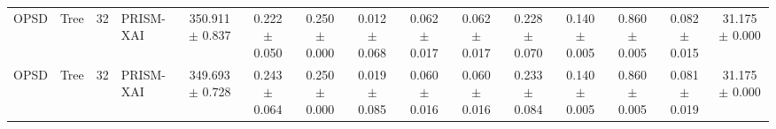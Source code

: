 \begin{table}[t]
\begin{tabular}{llllccccccccccc}
OPSD & Tree & 32 & PRISM-XAI & 350.911 $\pm$ 0.837 & 0.222 $\pm$ 0.050 & 0.250 $\pm$ 0.000 & 0.012 $\pm$ 0.068 & 0.062 $\pm$ 0.017 & 0.062 $\pm$ 0.017 & 0.228 $\pm$ 0.070 & 0.140 $\pm$ 0.005 & 0.860 $\pm$ 0.005 & 0.082 $\pm$ 0.015 & 31.175 $\pm$ 0.000 \\
OPSD & Tree & 32 & PRISM-XAI & 349.693 $\pm$ 0.728 & 0.243 $\pm$ 0.064 & 0.250 $\pm$ 0.000 & 0.019 $\pm$ 0.085 & 0.060 $\pm$ 0.016 & 0.060 $\pm$ 0.016 & 0.233 $\pm$ 0.084 & 0.140 $\pm$ 0.005 & 0.860 $\pm$ 0.005 & 0.081 $\pm$ 0.019 & 31.175 $\pm$ 0.000 \\
\bottomrule
\end{tabular}
\end{table}
